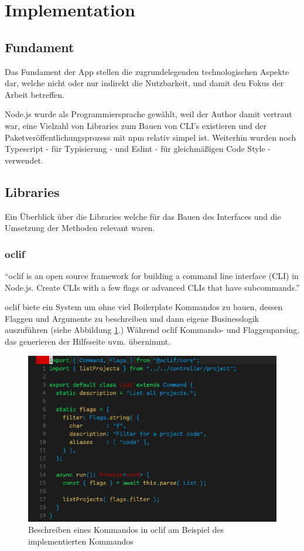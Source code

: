 \documentclass[oneside,bibliography=totocnumbered,BCOR=5mm]{scrbook}
\begin{document}
\section{Implementation}
\subsection{Fundament}

Das Fundament der App stellen die zugrundelegenden technologischen Aspekte dar,
welche nicht oder nur indirekt die Nutzbarkeit, und damit den Fokus der Arbeit
betreffen.

Node.js wurde als Programmiersprache gewählt, weil der Author damit vertraut
war, eine Vielzahl von Libraries zum Bauen von CLI's existieren und der
Paketveröffentlichungsprozess mit npm relativ simpel ist. Weiterhin wurden noch
Typescript - für Typisierung - und Eslint - für gleichmäßigen Code Style -
verwendet.

\subsection{Libraries}

Ein Überblick über die Libraries welche für das Bauen des Interfaces und die
Umsetzung der Methoden relevant waren.

\subsubsection{oclif}

``oclif is an open source framework for building a command line interface
(CLI) in Node.js. Create CLIs with a few flags or advanced CLIs that have
subcommands.'' \parencite{oclif}

oclif biete ein System um ohne viel Boilerplate Kommandos zu bauen, dessen
Flaggen und Argumente zu beschreiben und dann eigene Businesslogik auszuführen
(siehe Abbildung \ref{fig:oclif-list}.) Während oclif Kommando- und
Flaggenparsing, das generieren der Hilfsseite uvm. übernimmt.

\begin{figure} %
  \centering
  \includegraphics[scale=0.5]{oclif-list.png}
  \caption{Beschreiben eines Kommandos in oclif am Beispiel des implementierten  Kommandos}
  \label{fig:oclif-list}
\end{figure}
\end{document}
